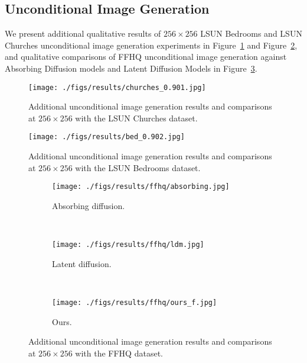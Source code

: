 \documentclass[10pt,twocolumn,letterpaper]{article}
\begin{document}
\subsection{Unconditional Image Generation}
\label{uncond_imgs}

We present additional qualitative results of $256 \times 256$ LSUN Bedrooms and LSUN Churches unconditional image generation experiments in Figure~\ref{fig:app_churches256} and Figure~\ref{fig:app_beds256}, and qualitative comparisons of FFHQ unconditional image generation against Absorbing Diffusion models \cite{unleashing} and Latent Diffusion Models \cite{latent} in Figure~\ref{fig:app_ffhq}.



\begin{figure}[t]
    \centering
	\texttt{[image: ./figs/results/churches\_0.901.jpg]}
\caption{Additional unconditional image generation results and comparisons at $256\times256$ with the LSUN Churches dataset. }
\label{fig:app_churches256}
\end{figure}

\begin{figure}[t]
    \centering
	\texttt{[image: ./figs/results/bed\_0.902.jpg]}
\caption{Additional unconditional image generation results and comparisons at $256\times256$ with the LSUN Bedrooms dataset. }
\label{fig:app_beds256}
\end{figure}



\begin{figure}[t]
    \centering
     \begin{subfigure}[b]{\textwidth}
         \centering
         \texttt{[image: ./figs/results/ffhq/absorbing.jpg]}
         \caption{Absorbing diffusion.}
     \end{subfigure}
     \\
     \vspace{2mm}
     \begin{subfigure}[b]{\textwidth}
         \centering
         \texttt{[image: ./figs/results/ffhq/ldm.jpg]}
         \caption{Latent diffusion.}
     \end{subfigure}
     \\
     \vspace{2mm}
     \begin{subfigure}[b]{\textwidth}
         \centering
         \texttt{[image: ./figs/results/ffhq/ours\_f.jpg]}
         \caption{Ours.}
     \end{subfigure}
    \caption{Additional unconditional image generation results and comparisons at $256\times256$ with the FFHQ dataset.}
    \label{fig:app_ffhq}
\end{figure}
\end{document}
